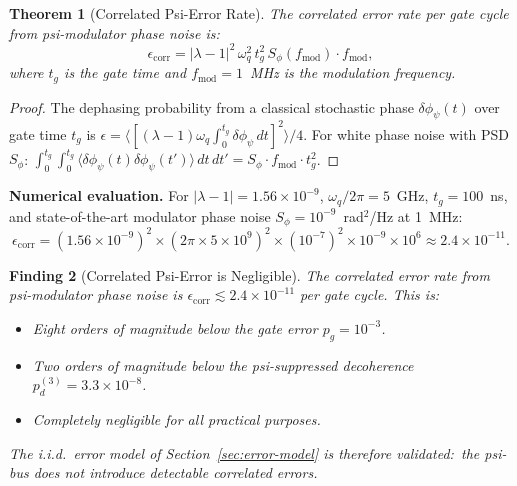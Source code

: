 \documentclass[11pt]{article}
\newtheorem{theorem}{Theorem}[section]
\newtheorem{finding}[theorem]{Finding}
\theoremstyle{definition}
\theoremstyle{remark}
\begin{document}
\begin{theorem}[Correlated Psi-Error Rate]
\label{thm:corr-error}
The correlated error rate per gate cycle from psi-modulator phase noise is:
\begin{equation}
  \epsilon_{\mathrm{corr}} = |\lambda-1|^2\,\omega_q^2\,t_g^2\,S_\phi(f_{\mathrm{mod}})\cdot f_{\mathrm{mod}},
  \label{eq:corr-error-rate}
\end{equation}
where $t_g$ is the gate time and $f_{\mathrm{mod}} = 1$~MHz is the modulation frequency.
\end{theorem}

\begin{proof}
The dephasing probability from a classical stochastic phase $\delta\phi_\psi(t)$
over gate time $t_g$ is $\epsilon = \langle[(\lambda-1)\omega_q\int_0^{t_g}\delta\phi_\psi\,dt]^2\rangle/4$.
For white phase noise with PSD $S_\phi$:
$\int_0^{t_g}\int_0^{t_g}\langle\delta\phi_\psi(t)\delta\phi_\psi(t')\rangle\,dt\,dt'
= S_\phi \cdot f_{\mathrm{mod}} \cdot t_g^2$.
\end{proof}

\textbf{Numerical evaluation.}  For $|\lambda-1| = 1.56\times10^{-9}$,
$\omega_q/2\pi = 5$~GHz, $t_g = 100$~ns, and state-of-the-art modulator
phase noise $S_\phi = 10^{-9}$~rad$^2$/Hz at 1~MHz:
\begin{equation}
  \epsilon_{\mathrm{corr}} = (1.56\times10^{-9})^2\times(2\pi\times5\times10^9)^2
  \times(10^{-7})^2\times10^{-9}\times10^6
  \approx 2.4\times10^{-11}.
  \label{eq:corr-error-numerical}
\end{equation}

\begin{finding}[Correlated Psi-Error is Negligible]
\label{finding:corr-error}
The correlated error rate from psi-modulator phase noise is
$\epsilon_{\mathrm{corr}} \lesssim 2.4\times10^{-11}$ per gate cycle.
This is:
\begin{itemize}
  \item Eight orders of magnitude below the gate error $p_g = 10^{-3}$.
  \item Two orders of magnitude below the psi-suppressed decoherence
    $p_d^{(3)} = 3.3\times10^{-8}$.
  \item Completely negligible for all practical purposes.
\end{itemize}
The i.i.d.\ error model of Section~\ref{sec:error-model} is therefore
\emph{validated}:\ the psi-bus does not introduce detectable correlated errors.
\end{finding}
\end{document}
